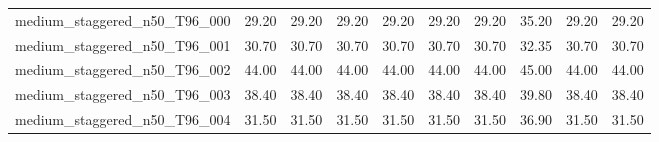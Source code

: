 \begin{table}[htbp]
\begin{tabular}{lrrrrrrrrr}
medium\_staggered\_n50\_T96\_000 & 29.20 & 29.20 & 29.20 & 29.20 & 29.20 & 29.20 & 35.20 & 29.20 & 29.20 \\
medium\_staggered\_n50\_T96\_001 & 30.70 & 30.70 & 30.70 & 30.70 & 30.70 & 30.70 & 32.35 & 30.70 & 30.70 \\
medium\_staggered\_n50\_T96\_002 & 44.00 & 44.00 & 44.00 & 44.00 & 44.00 & 44.00 & 45.00 & 44.00 & 44.00 \\
medium\_staggered\_n50\_T96\_003 & 38.40 & 38.40 & 38.40 & 38.40 & 38.40 & 38.40 & 39.80 & 38.40 & 38.40 \\
medium\_staggered\_n50\_T96\_004 & 31.50 & 31.50 & 31.50 & 31.50 & 31.50 & 31.50 & 36.90 & 31.50 & 31.50 \\
\bottomrule
\end{tabular}
\end{table}
